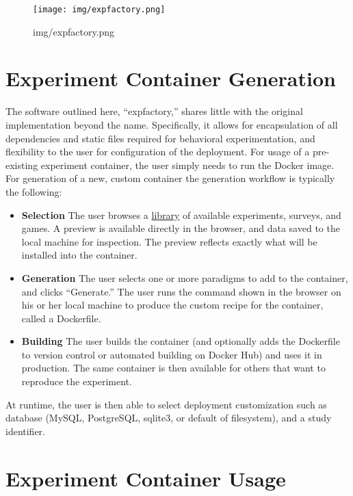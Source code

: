 \documentclass[10pt,a4paper,onecolumn]{article}
\providecommand{\tightlist}{%
  \setlength{\itemsep}{0pt}\setlength{\parskip}{0pt}}
\begin{document}
\begin{figure}
\centering
\texttt{[image: img/expfactory.png]}
\caption{img/expfactory.png}
\end{figure}

\hypertarget{experiment-container-generation}{%
\section{Experiment Container
Generation}\label{experiment-container-generation}}

The software outlined here, ``expfactory,'' shares little with the
original implementation beyond the name. Specifically, it allows for
encapsulation of all dependencies and static files required for
behavioral experimentation, and flexibility to the user for
configuration of the deployment. For usage of a pre-existing experiment
container, the user simply needs to run the Docker image. For generation
of a new, custom container the generation workflow is typically the
following:

\begin{itemize}
\tightlist
\item
  \textbf{Selection} The user browses a
  \href{https://expfactory.github.io/experiments/}{library} of available
  experiments, surveys, and games. A preview is available directly in
  the browser, and data saved to the local machine for inspection. The
  preview reflects exactly what will be installed into the container.
\item
  \textbf{Generation} The user selects one or more paradigms to add to
  the container, and clicks ``Generate.'' The user runs the command
  shown in the browser on his or her local machine to produce the custom
  recipe for the container, called a Dockerfile.
\item
  \textbf{Building} The user builds the container (and optionally adds
  the Dockerfile to version control or automated building on Docker Hub)
  and uses it in production. The same container is then available for
  others that want to reproduce the experiment.
\end{itemize}

At runtime, the user is then able to select deployment customization
such as database (MySQL, PostgreSQL, sqlite3, or default of filesystem),
and a study identifier.

\hypertarget{experiment-container-usage}{%
\section{Experiment Container Usage}\label{experiment-container-usage}}
\end{document}
